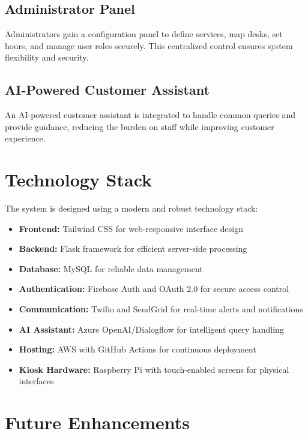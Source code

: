 \documentclass[12pt,a4paper]{report}
\begin{document}
\subsection{Administrator Panel}

Administrators gain a configuration panel to define services, map desks, set hours, and manage user roles securely. This centralized control ensures system flexibility and security.

\subsection{AI-Powered Customer Assistant}

An AI-powered customer assistant is integrated to handle common queries and provide guidance, reducing the burden on staff while improving customer experience.

\section{Technology Stack}

The system is designed using a modern and robust technology stack:

\begin{itemize}
    \item \textbf{Frontend:} Tailwind CSS for web-responsive interface design
    \item \textbf{Backend:} Flask framework for efficient server-side processing
    \item \textbf{Database:} MySQL for reliable data management
    \item \textbf{Authentication:} Firebase Auth and OAuth 2.0 for secure access control
    \item \textbf{Communication:} Twilio and SendGrid for real-time alerts and notifications
    \item \textbf{AI Assistant:} Azure OpenAI/Dialogflow for intelligent query handling
    \item \textbf{Hosting:} AWS with GitHub Actions for continuous deployment
    \item \textbf{Kiosk Hardware:} Raspberry Pi with touch-enabled screens for physical interfaces
\end{itemize}

\section{Future Enhancements}
\end{document}
